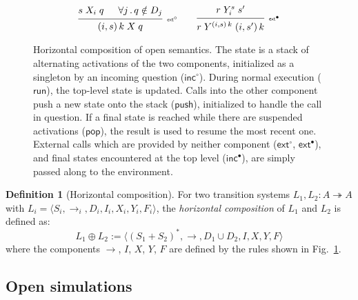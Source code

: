 \documentclass[11pt,oneside,draft]{book}
\theoremstyle{definition}
\newtheorem{definition}[theorem]{Definition}
\newcommand{\kw}[1]{\ensuremath{ \mathsf{#1} }}
\newcommand{\que}{\circ}         %
\newcommand{\ans}{\bullet}       %
\begin{document}
\begin{figure}
\begin{minipage}{0.66\textwidth}
\[\begin{array}{c}
      \\[1ex]
     {\begin{prooftree}
        \hypo{s \mathrel{X_i} q}
        \hypo{\forall j \,.\, q \notin D_j}
        \infer2[\tiny $\kw{ext}^\que$]{(i, s) \, k \mathrel{X} q}
      \end{prooftree}}
      \qquad
     {\begin{prooftree}
        \hypo{r \mathrel{Y_i^s} s'}
        \infer1[\tiny $\kw{ext}^\ans$]{
          r \mathrel{Y^{(i, s) \, k}} (i, s') \, k}
      \end{prooftree}}
    \end{array}
  \]
  \end{minipage}
    \caption[Horizontal composition of open semantics]%
     {Horizontal composition of open semantics.
      The state is a stack of alternating activations
      of the two components,
      initialized as a singleton by an incoming question ($\kw{inc}^\que$).
      During normal execution ($\kw{run}$),
      the top-level state is updated.
      Calls into the other component
      push a new state onto the stack ($\kw{push}$),
      initialized to handle the call in question.
      If a final state is reached
      while there are suspended activations ($\kw{pop}$),
      the result is used to resume the most recent one.
      External calls which are provided by neither component
      ($\kw{ext}^\que$, $\kw{ext}^\ans$),
      and final states encountered at the top level
      ($\kw{inc}^\ans$),
      are simply passed along to the environment.
    }
    \label{fig:hcomp}
\end{figure}

\begin{definition}[Horizontal composition] \label{def:hcomp} %
For two transition systems $L_1, L_2 : A \twoheadrightarrow A$
with
$L_i = \langle S_i, {\rightarrow}_i, D_i, I_i, X_i, Y_i, F_i \rangle$,
the \emph{horizontal composition} of $L_1$ and $L_2$
is defined as:
\[
    L_1 \oplus L_2 :=
    \langle
      (S_1 + S_2)^*, {\rightarrow}, D_1 \cup D_2, I, X, Y, F
    \rangle
\]
where the components $\rightarrow$, $I$, $X$, $Y$, $F$
are defined by
the rules shown in Fig.~\ref{fig:hcomp}.
\end{definition}



\subsection{Open simulations} \label{sec:sem:ref} %
\end{document}
